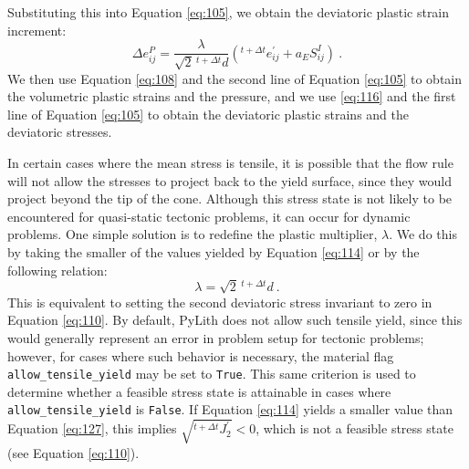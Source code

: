 Substituting this into Equation \vref{eq:105}, we obtain the deviatoric
plastic strain increment:
\begin{equation}
\Delta e_{ij}^{P}=\frac{\lambda}{\sqrt{2}\,\phantom{}^{t+\Delta t}d}\left(^{t+\Delta t}e_{ij}^{\prime}+a_{E}S_{ij}^{I}\right)\:.\label{eq:116}
\end{equation}
We then use Equation \vref{eq:108} and the second line of Equation
\vref{eq:105} to obtain the volumetric plastic strains and the pressure,
and we use \vref{eq:116} and the first line of Equation \vref{eq:105}
to obtain the deviatoric plastic strains and the deviatoric stresses.

In certain cases where the mean stress is tensile, it is possible
that the flow rule will not allow the stresses to project back to
the yield surface, since they would project beyond the tip of the
cone. Although this stress state is not likely to be encountered for
quasi-static tectonic problems, it can occur for dynamic problems.
One simple solution is to redefine the plastic multiplier, $\lambda$.
We do this by taking the smaller of the values yielded by Equation
\vref{eq:114} or by the following relation:
\begin{equation}
\lambda=\sqrt{2}\,\phantom{}^{t+\Delta t}d\:.\label{eq:127}
\end{equation}
This is equivalent to setting the second deviatoric stress invariant
to zero in Equation \vref{eq:110}. By default, PyLith does not allow
such tensile yield, since this would generally represent an error
in problem setup for tectonic problems; however, for cases where such
behavior is necessary, the material flag \texttt{allow\_tensile\_yield}
may be set to \texttt{True}. This same criterion is used to determine
whether a feasible stress state is attainable in cases where \texttt{allow\_tensile\_yield}
is \texttt{False}. If Equation \vref{eq:114} yields a smaller value
than Equation \vref{eq:127}, this implies $\sqrt{^{t+\Delta t}J_{2}^{\prime}}<0$,
which is not a feasible stress state (see Equation \vref{eq:110}).

